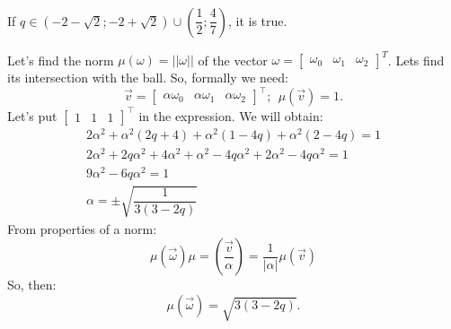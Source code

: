 \documentclass[12pt]{report}
\begin{document}
\begin{solution}
\begin{itemize}
\[\begin{array}{c}
         \end{array}
      \]
      If $q \in (-2-\sqrt{2}; -2+\sqrt{2}) \cup \left(\dfrac{1}{2}; \dfrac{4}{7}\right)$, it is {\color{green} true}.
    \end{itemize}
    Let's find the norm $\mu(\omega) = ||\omega||$ of the vector $\omega = \begin{bmatrix}
      \omega_0 & \omega_1 & \omega_2
    \end{bmatrix}^T$. Lets find its intersection with the ball. So, formally we need:
    \[
         \vec{v} = \begin{bmatrix}
            \alpha \omega_0 & \alpha \omega_1 & \alpha \omega_2
         \end{bmatrix}^\intercal; \ \ \mu(\vec{v}) = 1.
    \]
    Let's put $\begin{bmatrix}
      1 & 1 & 1
    \end{bmatrix}^\intercal$ in the expression. We will obtain:
    \[
      \begin{array}{c}
         2\alpha^2 + \alpha^2 (2q + 4) + \alpha^2 (1-4q) + \alpha^2 (2-4q) = 1\\
         2\alpha^2 + 2q\alpha^2 + 4\alpha^2 + \alpha^2 - 4q\alpha^2 + 2\alpha^2 -4q\alpha^2 = 1 \\
         9\alpha^2 - 6q\alpha^2 = 1 \\
         \alpha = \pm \sqrt{\dfrac{1}{3(3-2q)}}         
      \end{array}
    \]
    From properties of a norm:
    \[
         \mu\left(\vec{\omega}\right) \mu = \left(\dfrac{\vec{v}}{\alpha}\right) = \dfrac{1}{|\alpha|} \mu \left(\vec{v}\right)
    \]
    So, then:
    \[
         \mu\left(\vec{\omega}\right) = \sqrt{3(3-2q)}.
    \]
\end{solution}
\end{document}
